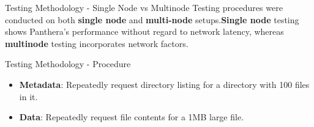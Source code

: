 \documentclass[final]{beamer} %
\begin{document}
\begin{frame}
\begin{columns}[t]
\begin{column}{0.32\textwidth}
	\begin{block}{Testing Methodology - Single Node vs Multinode}
	Testing procedures were conducted on both \textbf{single node} and \textbf{multi-node} setups.\textbf{Single node} testing shows Panthera's performance without regard to network latency, whereas \textbf{multinode} testing incorporates network factors.
	\end{block}
	
	\begin{block}{Testing Methodology - Procedure}
	\begin{itemize}
		\item \textbf{Metadata}: Repeatedly request directory listing for a directory with 100 files in it.
		\item \textbf{Data}: Repeatedly request file contents for a 1MB large file.
	\end{itemize}
	\end{block}


\end{column}
\end{columns}
\end{frame}
\end{document}
